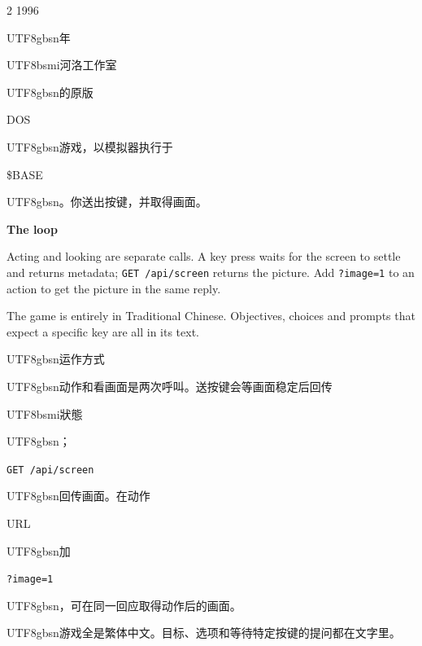 \begin{paracol}{2}
1996 \begin{CJK}{UTF8}{gbsn}年\end{CJK}\begin{CJK}{UTF8}{bsmi}河洛工作室\end{CJK}\begin{CJK}{UTF8}{gbsn}的原版\end{CJK} DOS \begin{CJK}{UTF8}{gbsn}游戏，以模拟器执行于\end{CJK} \$BASE\begin{CJK}{UTF8}{gbsn}。你送出按键，并取得画面。\end{CJK}\par
\switchcolumn*
\footnotesize\setlength{\parskip}{2pt}
{\footnotesize\bfseries The loop\par}
Acting and looking are separate calls. A key press waits for the screen to settle and returns metadata; \texttt{GET /api/screen} returns the picture. Add \texttt{?image=1} to an action to get the picture in the same reply.\par
The game is entirely in Traditional Chinese. Objectives, choices and prompts that expect a specific key are all in its text.\par
\switchcolumn
\footnotesize\setlength{\parskip}{2pt}
{\footnotesize\bfseries \begin{CJK}{UTF8}{gbsn}运作方式\end{CJK}\par}
\begin{CJK}{UTF8}{gbsn}动作和看画面是两次呼叫。送按键会等画面稳定后回传\end{CJK}\begin{CJK}{UTF8}{bsmi}狀態\end{CJK}\begin{CJK}{UTF8}{gbsn}；\end{CJK}\texttt{GET /api/screen} \begin{CJK}{UTF8}{gbsn}回传画面。在动作\end{CJK} URL \begin{CJK}{UTF8}{gbsn}加\end{CJK} \texttt{?image=1}\begin{CJK}{UTF8}{gbsn}，可在同一回应取得动作后的画面。\end{CJK}\par
\begin{CJK}{UTF8}{gbsn}游戏全是繁体中文。目标、选项和等待特定按键的提问都在文字里。\end{CJK}\par
\switchcolumn*
\footnotesize\setlength{\parskip}{2pt}

\end{paracol}
